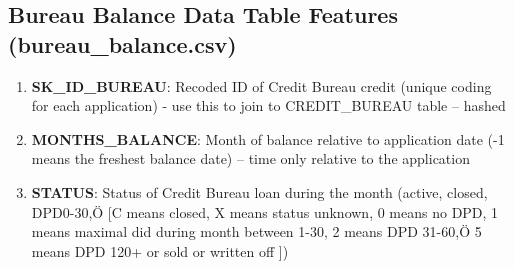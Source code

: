 \documentclass[12pt, letterpaper]{article}
\begin{document}
\begin{appendices}
\subsection{Bureau Balance Data Table Features (bureau_balance.csv)}
\label{bureaubalancedatatablefeatures}
\begin{enumerate}
  \item \textbf{SK_ID_BUREAU}: Recoded ID of Credit Bureau credit (unique coding for each application) - use this to join to CREDIT_BUREAU table -- hashed
  \item \textbf{MONTHS_BALANCE}: Month of balance relative to application date (-1 means the freshest balance date) -- time only relative to the application
  \item \textbf{STATUS}: Status of Credit Bureau loan during the month (active, closed, DPD0-30,Ö [C means closed, X means status unknown, 0 means no DPD, 1 means maximal did during month between 1-30, 2 means DPD 31-60,Ö 5 means DPD 120+ or sold or written off ])
\end{enumerate}


\end{appendices}
\end{document}
